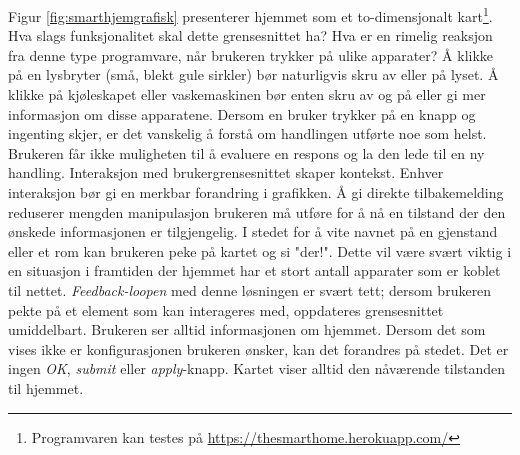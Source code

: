 Figur \ref{fig:smarthjemgrafisk} presenterer hjemmet som et to-dimensjonalt kart\footnote{Programvaren kan testes på \url{https://thesmarthome.herokuapp.com/}}. Hva slags funksjonalitet skal dette grensesnittet ha? Hva er en rimelig reaksjon fra denne type programvare, når brukeren trykker på ulike apparater? Å klikke på en lysbryter (små, blekt gule sirkler) bør naturligvis skru av eller på lyset. Å klikke på kjøleskapet eller vaskemaskinen bør enten skru av og på eller gi mer informasjon om disse apparatene. Dersom en bruker trykker på en knapp og ingenting skjer, er det vanskelig å forstå om handlingen utførte noe som helst. Brukeren får ikke muligheten til å evaluere en respons og la den lede til en ny handling. Interaksjon med brukergrensesnittet skaper kontekst. Enhver interaksjon bør gi en merkbar forandring i grafikken. Å gi direkte tilbakemelding reduserer mengden manipulasjon brukeren må utføre for å nå en tilstand der den ønskede informasjonen er tilgjengelig. I stedet for å vite navnet på en gjenstand eller et rom kan brukeren peke på kartet og si "der!". Dette vil være svært viktig i en situasjon i framtiden der hjemmet har et stort antall apparater som er koblet til nettet. \emph{Feedback-loopen} med denne løsningen er svært tett; dersom brukeren pekte på et element som kan interageres med, oppdateres grensesnittet umiddelbart. Brukeren ser alltid informasjonen om hjemmet. Dersom det som vises ikke er konfigurasjonen brukeren ønsker, kan det forandres på stedet. Det er ingen \emph{OK}, \emph{submit} eller \emph{apply}-knapp. Kartet viser alltid den nåværende tilstanden til hjemmet.\\
